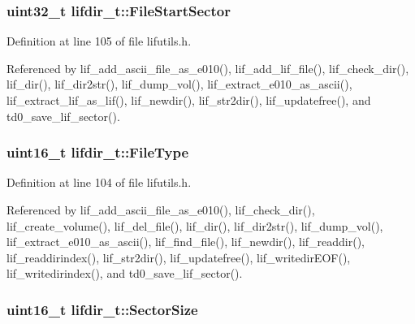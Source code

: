 \subsubsection[{\texorpdfstring{File\+Start\+Sector}{FileStartSector}}]{\setlength{\rightskip}{0pt plus 5cm}uint32\+\_\+t lifdir\+\_\+t\+::\+File\+Start\+Sector}\hypertarget{structlifdir__t_ac17bb6f653b05078f5fc8112c21286f2}{}\label{structlifdir__t_ac17bb6f653b05078f5fc8112c21286f2}


Definition at line 105 of file lifutils.\+h.



Referenced by lif\+\_\+add\+\_\+ascii\+\_\+file\+\_\+as\+\_\+e010(), lif\+\_\+add\+\_\+lif\+\_\+file(), lif\+\_\+check\+\_\+dir(), lif\+\_\+dir(), lif\+\_\+dir2str(), lif\+\_\+dump\+\_\+vol(), lif\+\_\+extract\+\_\+e010\+\_\+as\+\_\+ascii(), lif\+\_\+extract\+\_\+lif\+\_\+as\+\_\+lif(), lif\+\_\+newdir(), lif\+\_\+str2dir(), lif\+\_\+updatefree(), and td0\+\_\+save\+\_\+lif\+\_\+sector().

\subsubsection[{\texorpdfstring{File\+Type}{FileType}}]{\setlength{\rightskip}{0pt plus 5cm}uint16\+\_\+t lifdir\+\_\+t\+::\+File\+Type}\hypertarget{structlifdir__t_a7a93a706ac4bb88f65826619c9b02231}{}\label{structlifdir__t_a7a93a706ac4bb88f65826619c9b02231}


Definition at line 104 of file lifutils.\+h.



Referenced by lif\+\_\+add\+\_\+ascii\+\_\+file\+\_\+as\+\_\+e010(), lif\+\_\+check\+\_\+dir(), lif\+\_\+create\+\_\+volume(), lif\+\_\+del\+\_\+file(), lif\+\_\+dir(), lif\+\_\+dir2str(), lif\+\_\+dump\+\_\+vol(), lif\+\_\+extract\+\_\+e010\+\_\+as\+\_\+ascii(), lif\+\_\+find\+\_\+file(), lif\+\_\+newdir(), lif\+\_\+readdir(), lif\+\_\+readdirindex(), lif\+\_\+str2dir(), lif\+\_\+updatefree(), lif\+\_\+writedir\+E\+O\+F(), lif\+\_\+writedirindex(), and td0\+\_\+save\+\_\+lif\+\_\+sector().

\subsubsection[{\texorpdfstring{Sector\+Size}{SectorSize}}]{\setlength{\rightskip}{0pt plus 5cm}uint16\+\_\+t lifdir\+\_\+t\+::\+Sector\+Size}\hypertarget{structlifdir__t_adf3c38eecddce15925157383ff38ef2d}{}\label{structlifdir__t_adf3c38eecddce15925157383ff38ef2d}


